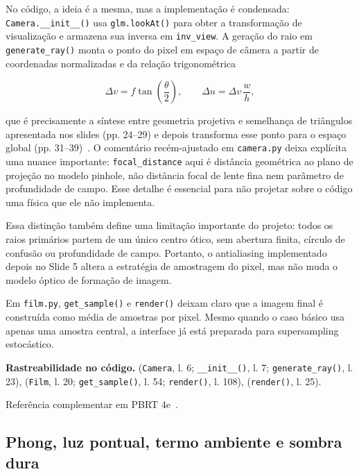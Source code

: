 \documentclass[portuguese]{sbcreviews-2025}%
\newcommand{\pbrtsec}[1]{PBRT 4e~\citep[Se\c{c}\~ao~#1]{pharr2023pbrt}}
\begin{document}
No código, a ideia é a mesma, mas a implementação é condensada: \texttt{Camera.\_\_init\_\_()} usa \texttt{glm.lookAt()} para obter a transformação de visualização e armazena sua inversa em \texttt{inv\_view}. A geração do raio em \texttt{generate\_ray()} monta o ponto do pixel em espaço de câmera a partir de coordenadas normalizadas e da relação trigonométrica

\[
\Delta v = f\tan\left(\frac{\theta}{2}\right),\qquad \Delta u = \Delta v\,\frac{w}{h},
\]

que é precisamente a síntese entre geometria projetiva e semelhança de triângulos apresentada nos slides (pp. 24--29) e depois transforma esse ponto para o espaço global (pp. 31--39)~\citep{inf2608slides04}. O comentário recém-ajustado em \texttt{camera.py} deixa explícita uma nuance importante: \texttt{focal\_distance} aqui é distância geométrica ao plano de projeção no modelo pinhole, não distância focal de lente fina nem parâmetro de profundidade de campo. Esse detalhe é essencial para não projetar sobre o código uma física que ele não implementa.

Essa distinção também define uma limitação importante do projeto: todos os raios primários partem de um único centro ótico, sem abertura finita, círculo de confusão ou profundidade de campo. Portanto, o antialiasing implementado depois no Slide 5 altera a estratégia de amostragem do pixel, mas não muda o modelo óptico de formação de imagem.

Em \texttt{film.py}, \texttt{get\_sample()} e \texttt{render()} deixam claro que a imagem final é construída como média de amostras por pixel. Mesmo quando o caso básico usa apenas uma amostra central, a interface já está preparada para supersampling estocástico.

\noindent\textbf{Rastreabilidade no código.}  (\texttt{Camera}, l. 6; \texttt{\_\_init\_\_()}, l. 7; \texttt{generate\_ray()}, l. 23),  (\texttt{Film}, l. 20; \texttt{get\_sample()}, l. 54; \texttt{render()}, l. 108),  (\texttt{render()}, l. 25).

Referência complementar em \pbrtsec{5.2}.

\subsection{Phong, luz pontual, termo ambiente e sombra dura}
\label{sec:slide4-phong}
\end{document}
